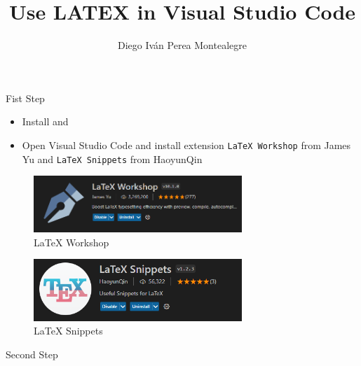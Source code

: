 \documentclass{article}
\title{Use LATEX in Visual Studio Code}
\author{Diego Iván Perea Montealegre}
\theoremstyle{mytheoremstyle}
\theoremstyle{mytheoremstyle}
\theoremstyle{myproblemstyle}
\begin{document}
    \maketitle
    Fist Step
   

    \begin{itemize}
        \item Install \textcite{miktex} and  \textcite{strawberryperl}
        \item Open Visual Studio Code and install extension \texttt{LaTeX Workshop} from James Yu  and \texttt{LaTeX Snippets} from HaoyunQin
    \end{itemize}

    \begin{figure}[h]
        \centering
        \includegraphics[width=0.7\textwidth ]{img/latexWorkshop.PNG}
        \caption{LaTeX Workshop}
        \label{fig:LaTeX Workshop}
    \end{figure}

    \begin{figure}[h]
        \centering
        \includegraphics[width=0.7\textwidth,height=0.2\textwidth ]{img/latexSnippets.PNG}
        \caption{LaTeX Snippets}
        \label{fig:LaTeX Snippets}
    \end{figure}

    \maketitle
    Second Step
   
\end{document}
